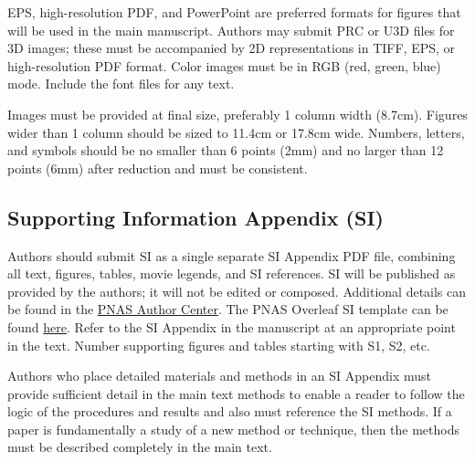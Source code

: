 \documentclass[9pt,twocolumn,twoside]{pnas-new}
\begin{document}
EPS, high-resolution PDF, and PowerPoint are preferred formats for figures that will be used in the main manuscript. Authors may submit PRC or U3D files for 3D images; these must be accompanied by 2D representations in TIFF, EPS, or high-resolution PDF format. Color images must be in RGB (red, green, blue) mode. Include the font files for any text.

Images must be provided at final size, preferably 1 column width (8.7cm). Figures wider than 1 column should be sized to 11.4cm or 17.8cm wide. Numbers, letters, and symbols should be no smaller than 6 points (2mm) and no larger than 12 points (6mm) after reduction and must be consistent.



\subsection*{Supporting Information Appendix (SI)}

Authors should submit SI as a single separate SI Appendix PDF file, combining all text, figures, tables, movie legends, and SI references. SI will be published as provided by the authors; it will not be edited or composed. Additional details can be found in the \href{https://www.pnas.org/authors/submitting-your-manuscript#manuscript-formatting-guidelines}{PNAS Author Center}. The PNAS Overleaf SI template can be found \href{https://www.overleaf.com/latex/templates/pnas-template-for-supplementary-information/wqfsfqwyjtsd}{here}. Refer to the SI Appendix in the manuscript at an appropriate point in the text. Number supporting figures and tables starting with S1, S2, etc.

Authors who place detailed materials and methods in an SI Appendix must provide sufficient detail in the main text methods to enable a reader to follow the logic of the procedures and results and also must reference the SI methods. If a paper is fundamentally a study of a new method or technique, then the methods must be described completely in the main text.




\end{document}
